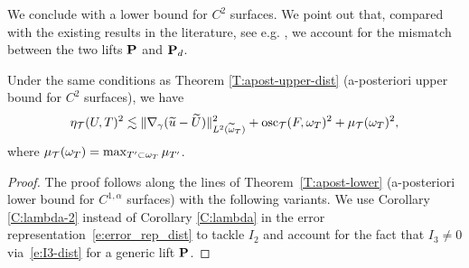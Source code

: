 We conclude with a lower bound for $C^2$ surfaces.
We point out that, compared with the existing results in the literature, see e.g. \cite{DemlowDziuk:07}, we account for the mismatch between the two lifts ${\bf P}$ and ${\bf P}_d$. 

\begin{theorem}\label{T:apost-lower-dist}
Under the same conditions as Theorem \ref{T:apost-upper-dist} (a-posteriori
upper bound for $C^{2}$ surfaces), we have
%
\[
\eta_{\mathcal{T}}(U,T)^2 \lesssim \| \nabla_\gamma (\widetilde{u}- \widetilde U) \|_{L^2(\widetilde{\omega}_T)}^2
+ \operatorname{osc}_{\mathcal{T}}(F,\omega_T)^2 + \mu_{\mathcal{T}}(\omega_T)^2,
\]
%
where $\mu_{\mathcal{T}}(\omega_T) = \max_{T' \subset \omega_T} \mu_{T'}$.
\end{theorem}  
%
\begin{proof}
The proof follows along the lines of Theorem~\ref{T:apost-lower} (a-posteriori lower bound for $C^{1,\alpha}$ surfaces) with the following variants.
We use Corollary \ref{C:lambda-2} instead of Corollary \ref{C:lambda} in
the error representation~\eqref{e:error_rep_dist} to tackle $I_2$
and account for the fact that $I_3\ne0$ via~\eqref{e:I3-dist} for a generic
lift ${\bf P}$.
\end{proof}

 

